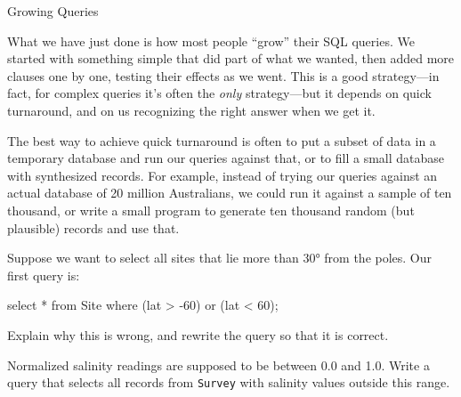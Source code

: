 \documentclass{book}
\begin{document}
\begin{swcbox}{Growing Queries}

What we have just done is how most people ``grow'' their SQL queries. We
started with something simple that did part of what we wanted, then
added more clauses one by one, testing their effects as we went. This is
a good strategy---in fact, for complex queries it's often the
\emph{only} strategy---but it depends on quick turnaround, and on us
recognizing the right answer when we get it.

The best way to achieve quick turnaround is often to put a subset of
data in a temporary database and run our queries against that, or to
fill a small database with synthesized records. For example, instead of
trying our queries against an actual database of 20 million Australians,
we could run it against a sample of ten thousand, or write a small
program to generate ten thousand random (but plausible) records and use
that.

\end{swcbox}

\begin{challenge}
  Suppose we want to select all sites that lie more than 30° from the
  poles. Our first query is:

\begin{VerbIn}
select * from Site where (lat > -60) or (lat < 60);
\end{VerbIn}

  Explain why this is wrong, and rewrite the query so that it is
  correct.
\end{challenge}

\begin{challenge}
  Normalized salinity readings are supposed to be between 0.0 and 1.0.
  Write a query that selects all records from \texttt{Survey} with
  salinity values outside this range.
\end{challenge}
\end{document}
